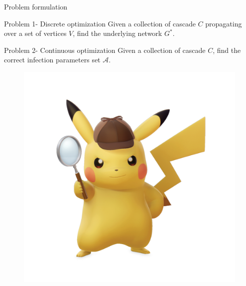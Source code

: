 \documentclass{beamer}
\begin{document}
\begin{frame}{Problem formulation}
\begin{block}{Problem 1- Discrete optimization}
Given a collection of cascade $C$ propagating over a set of vertices $V$, find the underlying network $G^*$.
\end{block}
\begin{block}{Problem 2- Continuous optimization}
Given a collection of cascade $C$, find the correct infection parameters set $\mathscr{A}$.  
\end{block}
\begin{figure}
    \centering
    \includegraphics[scale = 0.08]{Detective_Pikachu_-_Character_artwork_01.png}
\end{figure}
\end{frame}
\end{document}
